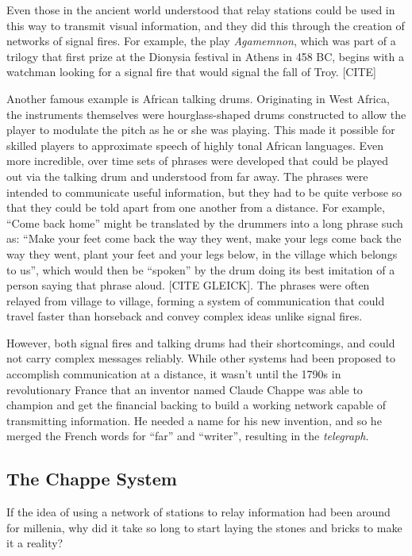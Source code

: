 \documentclass[UTF8]{book}
\begin{document}
\begin{CJK}{UTF8}{gbsn}
Even those in the ancient world understood that relay stations could be used in this way to transmit visual information, and they did this through the creation of networks of signal fires. For example, the play \emph{Agamemnon}, which was part of a trilogy that first prize at the Dionysia festival in Athens in 458 BC, begins with a watchman looking for a signal fire that would signal the fall of Troy. [CITE]

Another famous example is African talking drums. Originating in West Africa, the instruments themselves were hourglass-shaped drums constructed to allow the player to modulate the pitch as he or she was playing. This made it possible for skilled players to approximate speech of highly tonal African languages. Even more incredible, over time sets of phrases were developed that could be played out via the talking drum and understood from far away. The phrases were intended to communicate useful information, but they had to be quite verbose so that they could be told apart from one another from a distance. For example, ``Come back home'' might be translated by the drummers into a long phrase such as: ``Make your feet come back the way they went, make your legs come back the way they went, plant your feet and your legs below, in the village which belongs to us'', which would then be ``spoken'' by the drum doing its best imitation of a person saying that phrase aloud. [CITE GLEICK]. The phrases were often relayed from village to village, forming a system of communication that could travel faster than horseback and convey complex ideas unlike signal fires.

However, both signal fires and talking drums had their shortcomings, and could not carry complex messages reliably. While other systems had been proposed to accomplish communication at a distance, it wasn't until the 1790s in revolutionary France that an inventor named Claude Chappe was able to champion and get the financial backing to build a working network capable of transmitting information. He needed a name for his new invention, and so he merged the French words for ``far'' and ``writer'', resulting in the \emph{telegraph}.

\subsection{The Chappe System}

If the idea of using a network of stations to relay information had been around for millenia, why did it take so long to start laying the stones and bricks to make it a reality?


\end{CJK}
\end{document}
